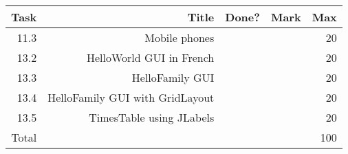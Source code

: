 \\ \\ \\ \noindent\parbox[l]{\textwidth}{
 \\ \\
\begin{tabular}{||r|r|r|r|r||} \hline \hline
Task  & Title                            & Done? & Mark & Max \\ \hline
11.3 & Mobile phones & & & 20 \\ \hline
13.2 & HelloWorld GUI in French & & & 20 \\ \hline
13.3 & HelloFamily GUI & & & 20 \\ \hline
13.4 & HelloFamily GUI with GridLayout & & & 20 \\ \hline
13.5 & TimesTable using JLabels & & & 20 \\ \hline
\hline
Total &                                  &       &      & 100 \\ \hline
\hline
\end{tabular} \\ \\
}
